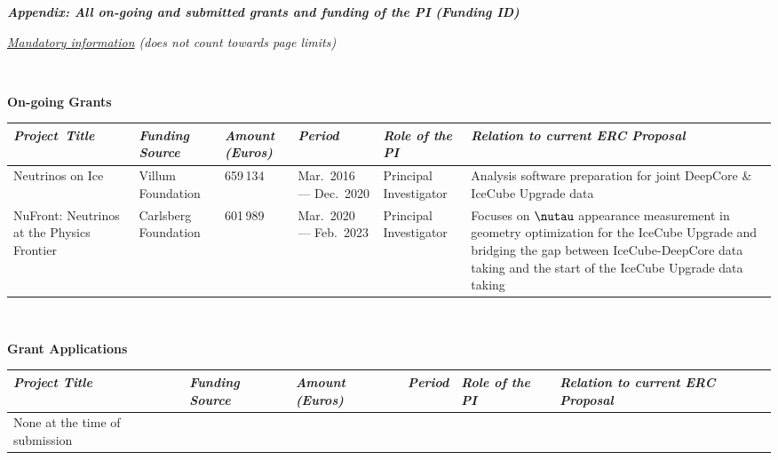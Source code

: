\documentclass[a4paper,11pt]{article}
\renewcommand{\smallskip} {\vspace{0.1in}}
\begin{document}
\newpage 




\centerline{ {\textit{\textbf{ Appendix: All on-going and submitted grants and funding of the PI (Funding ID)}}
}} \smallskip
\centerline{ \it \underline{Mandatory information} (does not count towards page limits)
}\smallskip

~\vspace{2cm}

{\bf On-going Grants}
\begin{table}[h]
\centering
\begin{tabularx}{1\textwidth}{|C{0.125\textwidth}|C{0.125\textwidth}|C{0.0817\textwidth}|C{0.125\textwidth}|C{0.125\textwidth}|C{0.26\textwidth}|}
\hline
{} \it Project~Title & \it Funding Source & \it Amount (Euros) & \it Period & \it Role of the PI & \it Relation to current ERC Proposal\\
\hline
Neutrinos on Ice & Villum Foundation & 659\,134& Mar.~2016 --- Dec.~2020 & Principal Investigator & Analysis software preparation for joint DeepCore \& IceCube Upgrade data \\
\hline
NuFront: Neutrinos at the Physics Frontier& Carlsberg Foundation & 601\,989& Mar.~2020 --- Feb.~2023 & Principal Investigator & Focuses on $\nutau$ appearance measurement in geometry optimization for the IceCube Upgrade and bridging the gap between IceCube-DeepCore data taking and the start of the IceCube Upgrade data taking \\
\hline
\end{tabularx}
\end{table}

~\vspace{2cm}


{\bf Grant Applications}
\begin{table}[h]
\centering
\begin{tabularx}{1\textwidth}{|C{0.125\textwidth}|C{0.125\textwidth}|C{0.0817\textwidth}|C{0.125\textwidth}|C{0.125\textwidth}|C{0.26\textwidth}|}
\hline
{} \it  Project Title & \it Funding Source & \it Amount (Euros) & \it Period & \it Role of the PI & \it Relation to current ERC Proposal\\
\hline
None at the time of submission & $~~~~~~~~~~~~~~~~~~~$ & & & & \\
\hline
\end{tabularx}
\end{table}
\end{document}
